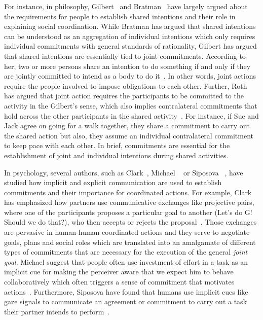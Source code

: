 \documentclass[a4paper,11pt,twoside]{StyleThese}
\begin{document}
For instance, in philosophy, Gilbert~\cite{gilbert_2009_shared} and Bratman~\cite{bratman_2014_shared} have largely argued about the requirements for people to establish shared intentions and their role in explaining social coordination. While Bratman has argued that shared intentions can be understood as an aggregation of individual intentions which only requires individual commitments with general standards of rationality, Gilbert has argued that shared intentions are essentially tied to joint commitments. According to her, two or more persons share an intention to do something if and only if they are jointly committed to intend as a body to do it~\cite{gilbert_2009_shared}. In other words, joint actions require the people involved to impose obligations to each other. Further, Roth has argued that joint action requires the participants to be committed to the activity in the Gilbert’s sense, which also implies contralateral commitments that hold across the other participants in the shared activity~\cite{roth_2014_shared}. For instance, if Sue and Jack agree on going for a walk together, they share a commitment to carry out the shared action but also, they assume an individual contralateral commitment to keep pace with each other. In brief, commitments are essential for the establishment of joint and individual intentions during shared activities. 

In psychology, several authors, such as Clark~\cite{clark_2006_social}, Michael \etal~\cite{michael2016} or Siposova \etal~\cite{siposova_2018_communicative}, have studied how implicit and explicit communication are used to establish commitments and their importance for coordinated actions. For example, Clark has emphasized how partners use communicative exchanges like projective pairs, where one of the participants proposes a particular goal to another (Let’s do G! Should we do that?), who then accepts or rejects the proposal~\cite{clark_2006_social}. Those exchanges are pervasive in human-human coordinated actions and they serve to negotiate goals, plans and social roles which are translated into an amalgamate of different types of commitments that are necessary for the execution of the general \emph{joint goal}. Michael \etal{} suggest that people often use investment of effort in a task as an implicit cue for making the perceiver aware that we expect him to behave collaboratively which often triggers a sense of commitment that motivates actions~\cite{michael2016}. Furthermore, Siposova \etal{} have found that humans use implicit cues like gaze signals to communicate an agreement or commitment to carry out a task their partner intends to perform~\cite{siposova_2018_communicative}.
\end{document}
